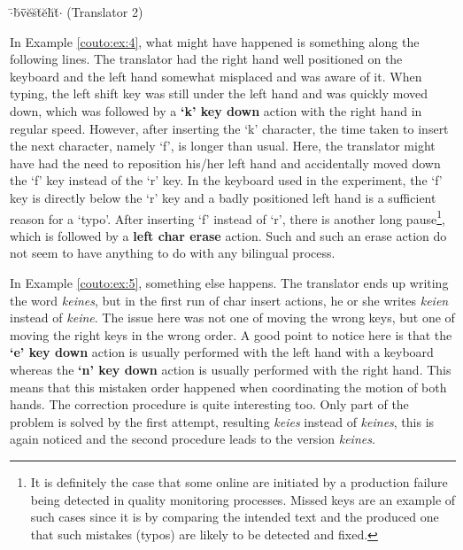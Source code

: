 \documentclass[output=paper]{LSP/langsci}
\begin{document}

\begin{exe}%
	\ex\label{couto:ex:6}$\cdot$\={ }b\u{ }v\={ }\uettl\={ }e\u{ }s\u{ }t\u{ }e\u{ }h\u{ }t\u{ }$\cdot$ (Translator 2)
\end{exe}

In Example \ref{couto:ex:4}, what might have happened is something along the following lines. The translator had the right hand well positioned on the keyboard and the left hand somewhat misplaced and was aware of it. When typing, the left shift key was still under the left hand and was quickly moved down, which was followed by a \textbf{`k' key down} action with the right hand in regular speed. However, after inserting the `k' character, the time taken to insert the next character, namely `f', is longer than usual. Here, the translator might have had the need to reposition his/her left hand and accidentally moved down the `f' key instead of the `r' key. In the  keyboard used in the experiment, the `f' key is directly below the `r' key and a badly positioned left hand is a sufficient reason for a `typo'.  After inserting `f' instead of `r', there is another long pause\footnote{It is definitely the case that some online  are initiated by a production failure being detected in quality monitoring processes. Missed keys are an example of such cases since it is by comparing the intended text and the produced one that such mistakes (typos) are likely to be detected and fixed.}, which is followed by a \textbf{left char erase} action. Such  and such an erase action do not seem to have anything to do with any bilingual process.

In Example \ref{couto:ex:5}, something else happens. The translator ends up writing the word \emph{keines}, but in the first run of char insert actions, he or she writes \emph{keien} instead of \emph{keine}. The issue here was not one of moving the wrong keys, but one of moving the right keys in the wrong order. A good point to notice here is that the \textbf{`e' key down} action is usually performed with the left hand with a  keyboard whereas the \textbf{`n' key down} action is usually performed with the right hand. This means that this mistaken order happened when coordinating the motion of both hands. The correction procedure is quite interesting too. Only part of the problem is solved by the first attempt, resulting \emph{keies} instead of \emph{keines}, this is again noticed and the second  procedure leads to the version \emph{keines}.
\end{document}
